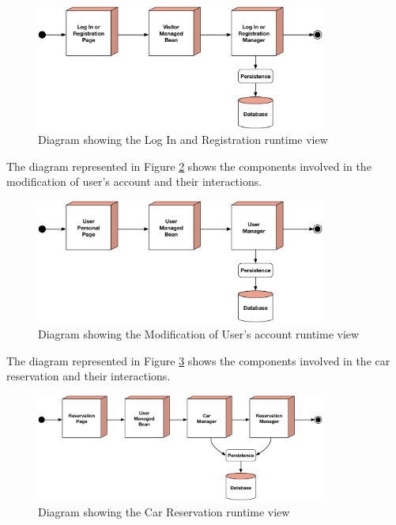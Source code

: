 \begin{figure}[htbp]
\centering
\vspace{52pt}
\includegraphics[width=0.85\textwidth]{Images/LogInRun.pdf}
\vspace{10pt}
\caption{Diagram showing the Log In and Registration runtime view}
\label{fig:login}
\end{figure}
\clearpage

\newline
The diagram represented in Figure \ref{fig:modify} shows the components involved in the modification of user's account and their interactions.

\begin{figure}[htbp]
\centering
\vspace{104pt}
\includegraphics[width=0.85\textwidth]{Images/ModifyRun.pdf}
\vspace{10pt}
\caption{Diagram showing the Modification of User's account runtime view}
\label{fig:modify}
\end{figure}
\clearpage

\newline
The diagram represented in Figure \ref{fig:reserve} shows the components involved in the car reservation and their interactions.

\begin{figure}[htbp]
\centering
\vspace{104pt}
\includegraphics[width=0.85\textwidth]{Images/ReserveRun.pdf}
\vspace{10pt}
\caption{Diagram showing the Car Reservation runtime view}
\label{fig:reserve}
\end{figure}
\clearpage

